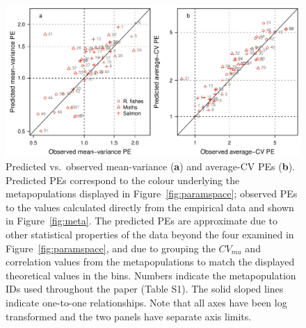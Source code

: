 \begin{figure}[htbp]
  \centering
  \includegraphics[width=\textwidth]{prophets/parameter-space-predicted-vs-observed-20120430.pdf}
  \caption[Predicted vs.\ observed mean-variance and average-CV
    PEs.]{ Predicted vs.\ observed mean-variance (\textbf{a}) and average-CV
    PEs (\textbf{b}).  Predicted PEs correspond to the colour underlying the
    metapopulations displayed in Figure~\ref{fig:paramspace}; observed PEs to
    the values calculated directly from the empirical data and shown in
    Figure~\ref{fig:meta}. The predicted PEs are approximate due to other
    statistical properties of the data beyond the four examined in
    Figure~\ref{fig:paramspace}, and due to grouping the $CV_{mu}$ and
    correlation values from the metapopulations to match the displayed
    theoretical values in the bins.  Numbers indicate the metapopulation IDs
    used throughout the paper (Table S1).  The solid sloped lines indicate
    one-to-one relationships.  Note that all axes have been log transformed
    and the two panels have separate axis limits.  }
  \label{fig:PE-predicted-observed}
\end{figure}

